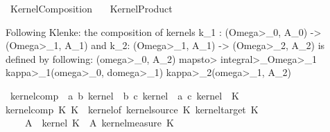%
\begin{isabellebody}%
%
%
\isadelimtheory
%
\endisadelimtheory
%
\isatagtheory
{}\isamarkupfalse%
\ Kernel{\isacharunderscore}{\kern0pt}Composition\isanewline
\ \ \ Kernel{\isacharunderscore}{\kern0pt}Product\isanewline
{}%
\endisatagtheory
{\isafoldtheory}%
%
\isadelimtheory
%
\endisadelimtheory
%
\begin{isamarkuptext}%
Following Klenke: the composition of kernels k_1 : (\<Omega>_0, A_0) -> (\<Omega>_1, A_1) and
   k_2: (\<Omega>_1, A_1) -> (\<Omega>_2, A_2) is defined by following:
  (\<omega>_0, A_2) \<mapsto> \<integral>_{\<Omega>_1} \<kappa>_1(\<omega>_0, d\<omega>_1) \<kappa>_2(\<omega>_1, A_2)%
\end{isamarkuptext}\isamarkuptrue%
\isamarkupfalse%
\ kernel{\isacharunderscore}{\kern0pt}comp\ {\isacharcolon}{\kern0pt}{\isacharcolon}{\kern0pt}\ {\isachardoublequoteopen}{\isacharparenleft}{\kern0pt}{\isacharprime}{\kern0pt}a{\isacharcomma}{\kern0pt}\ {\isacharprime}{\kern0pt}b{\isacharparenright}{\kern0pt}\ kernel\ {\isasymRightarrow}\ {\isacharparenleft}{\kern0pt}{\isacharprime}{\kern0pt}b{\isacharcomma}{\kern0pt}\ {\isacharprime}{\kern0pt}c{\isacharparenright}{\kern0pt}\ kernel\ {\isasymRightarrow}\ {\isacharparenleft}{\kern0pt}{\isacharprime}{\kern0pt}a{\isacharcomma}{\kern0pt}\ {\isacharprime}{\kern0pt}c{\isacharparenright}{\kern0pt}\ kernel{\isachardoublequoteclose}\ {\isacharparenleft}{\kern0pt}\ {\isachardoublequoteopen}{\isacharparenleft}{\kern0pt}{\isasymcirc}\isactrlsub K{\isacharparenright}{\kern0pt}{\isachardoublequoteclose}\ {}{}{\isacharparenright}{\kern0pt}\ \isanewline
{\isachardoublequoteopen}kernel{\isacharunderscore}{\kern0pt}comp\ K\ K\ {\isacharequal}{\kern0pt}\ kernel{\isacharunderscore}{\kern0pt}of\ {\isacharparenleft}{\kern0pt}kernel{\isacharunderscore}{\kern0pt}source\ K\ {\isacharparenleft}{\kern0pt}kernel{\isacharunderscore}{\kern0pt}target\ K\isanewline
\ \ \ {\isacharparenleft}{\kern0pt}{\isasymlambda}{\isasymomega}\ A\ {\isasymintegral}\isactrlsup {\isacharplus}{\kern0pt}{\isasymomega}\ kernel\ K\ {\isasymomega}\ A\ {\isasympartial}{\isacharparenleft}{\kern0pt}{\isacharparenleft}{\kern0pt}kernel{\isacharunderscore}{\kern0pt}measure\ K\ {\isasymomega}\isanewline

\end{isabellebody}
